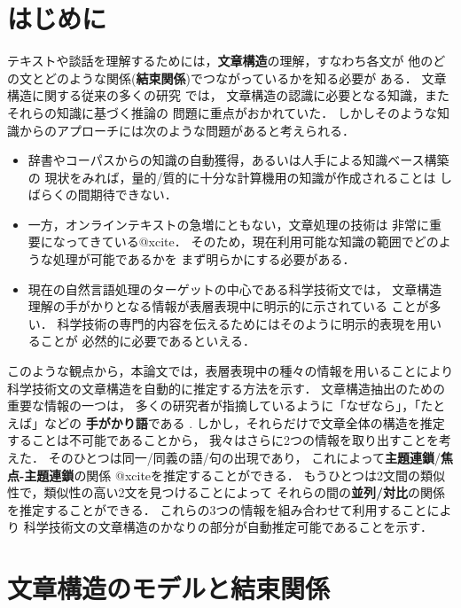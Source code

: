\section{はじめに}

テキストや談話を理解するためには，{\bf 文章構造}の理解，すなわち各文が
他のどの文とどのような関係({\bf 結束関係})でつながっているかを知る必要が
ある．
文章構造に関する従来の多くの研究
\cite[など]{GroszAndSidner1986,Hobbs1979,Hobbs1985,ZadroznyAndJensen1991}
では，
文章構造の認識に必要となる知識，またそれらの知識に基づく推論の
問題に重点がおかれていた．
しかしそのような知識からのアプローチには次のような問題があると考えられる．
\begin{itemize}
\item 
辞書やコーパスからの知識の自動獲得，あるいは人手による知識ベース構築の
現状をみれば，量的/質的に十分な計算機用の知識が作成されることは
しばらくの間期待できない．
\item 
一方，オンラインテキストの急増にともない，文章処理の技術は
非常に重要になってきている@xcite．
そのため，現在利用可能な知識の範囲でどのような処理が可能であるかを
まず明らかにする必要がある．
\item 
現在の自然言語処理のターゲットの中心である科学技術文では，
文章構造理解の手がかりとなる情報が表層表現中に明示的に示されている
ことが多い．
科学技術の専門的内容を伝えるためにはそのように明示的表現を用いることが
必然的に必要であるといえる．
\end{itemize}

このような観点から，本論文では，表層表現中の種々の情報を用いることにより
科学技術文の文章構造を自動的に推定する方法を示す．
文章構造抽出のための重要な情報の一つは，
多くの研究者が指摘しているように「なぜなら」，「たとえば」などの
{\bf 手がかり語}である
\cite[など]{Cohen1984,GroszAndSidner1986,Reichman1985,Ono1989,Yamamoto1991}. 
しかし，それらだけで文章全体の構造を推定することは不可能であることから，
我々はさらに2つの情報を取り出すことを考えた．
そのひとつは同一/同義の語/句の出現であり，
これによって{\bf 主題連鎖}/{\bf 焦点-主題連鎖}の関係
@xciteを推定することができる．
もうひとつは2文間の類似性で，類似性の高い2文を見つけることによって
それらの間の{\bf 並列/対比}の関係を推定することができる．
これらの3つの情報を組み合わせて利用することにより
科学技術文の文章構造のかなりの部分が自動推定可能であることを示す．



{\unitlength=1mm

}

\section{文章構造のモデルと結束関係}


